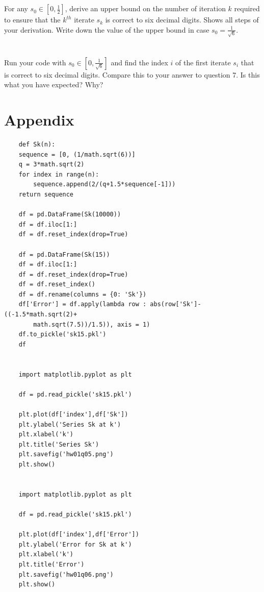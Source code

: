 \documentclass{article}
\begin{document}
\section{}
For any $s_0 \in \left[0, \frac{1}{2} \right]$, derive an upper bound on the number of iteration $k$ required to ensure that the $k^{th}$ iterate $s_k$ is correct to six decimal digits. Shows all steps of your derivation. Write down the value of the upper bound in case $s_0 = \frac{1}{\sqrt{6}}$.
\vspace{10mm}

\section{}
Run your code with $s_0 \in \left[0,\frac{1}{\sqrt{6}} \right]$ and find the index $i$ of the first iterate $s_i$ that is correct to six decimal digits. Compare this to your answer to question 7. Is this what you have expected? Why?
\vspace{10mm}



\section*{Appendix}

\begin{verbatim}
    def Sk(n):
    sequence = [0, (1/math.sqrt(6))]
    q = 3*math.sqrt(2)
    for index in range(n):
        sequence.append(2/(q+1.5*sequence[-1]))
    return sequence
    
    df = pd.DataFrame(Sk(10000))
    df = df.iloc[1:]
    df = df.reset_index(drop=True)
    
    df = pd.DataFrame(Sk(15))
    df = df.iloc[1:]
    df = df.reset_index(drop=True)
    df = df.reset_index()
    df = df.rename(columns = {0: 'Sk'})
    df['Error'] = df.apply(lambda row : abs(row['Sk']-((-1.5*math.sqrt(2)+
        math.sqrt(7.5))/1.5)), axis = 1) 
    df.to_pickle('sk15.pkl')
    df
    
    
    import matplotlib.pyplot as plt

    df = pd.read_pickle('sk15.pkl')

    plt.plot(df['index'],df['Sk'])
    plt.ylabel('Series Sk at k')
    plt.xlabel('k')
    plt.title('Series Sk')
    plt.savefig('hw01q05.png')
    plt.show()
    
    
    import matplotlib.pyplot as plt

    df = pd.read_pickle('sk15.pkl')

    plt.plot(df['index'],df['Error'])
    plt.ylabel('Error for Sk at k')
    plt.xlabel('k')
    plt.title('Error')
    plt.savefig('hw01q06.png')
    plt.show()
\end{verbatim}
\end{document}
